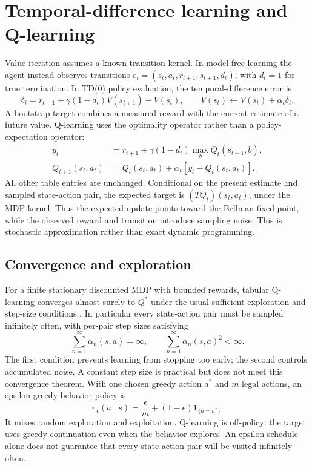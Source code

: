 \documentclass[11pt,a4paper]{article}
\newcommand{\one}{\mathbf 1}
\begin{document}
\section{Temporal-difference learning and Q-learning}
Value iteration assumes a known transition kernel. In model-free learning the agent instead observes transitions $e_t=(s_t,a_t,r_{t+1},s_{t+1},d_t)$, with $d_t=1$ for true termination. In TD(0) policy evaluation, the temporal-difference error is
\[
 \delta_t=r_{t+1}+\gamma(1-d_t)V(s_{t+1})-V(s_t),
 \qquad V(s_t)\leftarrow V(s_t)+\alpha_t\delta_t.
\]
A bootstrap target combines a measured reward with the current estimate of a future value. Q-learning \cite{watkins} uses the optimality operator rather than a policy-expectation operator:
\begin{align}
 y_t&=r_{t+1}+\gamma(1-d_t)\max_b Q_t(s_{t+1},b),\\
 Q_{t+1}(s_t,a_t)&=Q_t(s_t,a_t)+\alpha_t[y_t-Q_t(s_t,a_t)].\label{eq:qlearn}
\end{align}
All other table entries are unchanged. Conditional on the present estimate and sampled state-action pair, the expected target is $(TQ_t)(s_t,a_t)$, under the MDP kernel. Thus the expected update points toward the Bellman fixed point, while the observed reward and transition introduce sampling noise. This is stochastic approximation rather than exact dynamic programming.

\subsection{Convergence and exploration}
For a finite stationary discounted MDP with bounded rewards, tabular Q-learning converges almost surely to $Q^*$ under the usual sufficient exploration and step-size conditions \cite{watkins,sutton}. In particular every state-action pair must be sampled infinitely often, with per-pair step sizes satisfying
\[
 \sum_{n=1}^\infty\alpha_n(s,a)=\infty,\qquad
 \sum_{n=1}^\infty\alpha_n(s,a)^2<\infty.
\]
The first condition prevents learning from stopping too early; the second controls accumulated noise. A constant step size is practical but does not meet this convergence theorem. With one chosen greedy action $a^*$ and $m$ legal actions, an epsilon-greedy behavior policy is
\[
 \pi_\epsilon(a\mid s)=\frac{\epsilon}{m}+(1-\epsilon)\one_{\{a=a^*\}}.
\]
It mixes random exploration and exploitation. Q-learning is off-policy: the target uses greedy continuation even when the behavior explores. An epsilon schedule alone does not guarantee that every state-action pair will be visited infinitely often.
\end{document}
